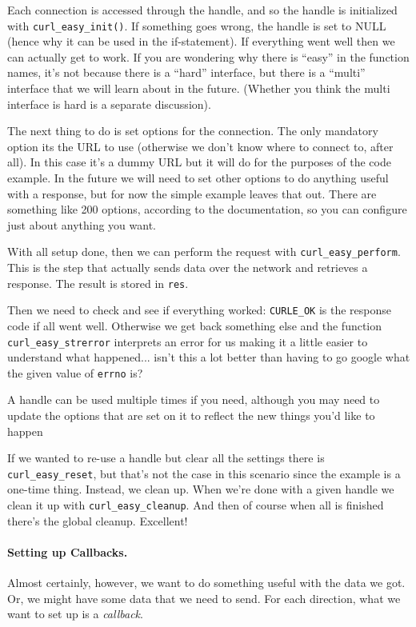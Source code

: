 \documentclass[a4paper]{report}
\begin{document}
Each connection is accessed through the handle, and so the handle is initialized with \texttt{curl\_easy\_init()}. If something goes wrong, the handle is set to NULL (hence why it can be used in the if-statement). If everything went well then we can actually get to work. If you are wondering why there is ``easy'' in the function names, it's not because there is a ``hard'' interface, but there is a ``multi'' interface that we will learn about in the future. (Whether you think the multi interface is hard is a separate discussion).

The next thing to do is set options for the connection. The only mandatory option its the URL to use (otherwise we don't know where to connect to, after all). In this case it's a dummy URL but it will do for the purposes of the code example. In the future we will need to set other options to do anything useful with a response, but for now the simple example leaves that out. There are something like 200 options, according to the documentation, so you can configure just about anything you want.

With all setup done, then we can perform the request with \texttt{curl\_easy\_perform}. This is the step that actually sends data over the network and retrieves a response. The result is stored in \texttt{res}.

Then we need to check and see if everything worked: \texttt{CURLE\_OK} is the response code if all went well. Otherwise we get back something else and the function \texttt{curl\_easy\_strerror} interprets an error for us making it a little easier to understand what happened... isn't this a lot better than having to go google what the given value of \texttt{errno} is?

A handle can be used multiple times if you need, although you may need to update the options that are set on it to reflect the new things you'd like to happen

If we wanted to re-use a handle but clear all the settings there is \texttt{curl\_easy\_reset}, but that's not the case in this scenario since the example is a one-time thing. Instead, we clean up. When we're done with a given handle we clean it up with \texttt{curl\_easy\_cleanup}. And then of course when all is finished there's the global cleanup. Excellent!

\paragraph{Setting up Callbacks.} Almost certainly, however, we want to do something useful with the data we got. Or, we might have some data that we need to send. For each direction, what we want to set up is a \textit{callback}.
\end{document}
